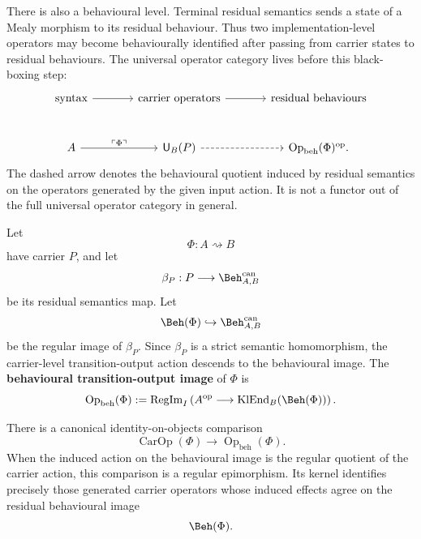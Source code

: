 There is also a behavioural level.  Terminal residual semantics sends a state of a Mealy morphism
to its residual behaviour.  Thus two implementation-level operators may become behaviourally
identified after passing from carrier states to residual behaviours.  The universal operator
category lives before this black-boxing step:
\[
\begin{tikzcd}[column sep=large,row sep=large]
\text{syntax}
\ar[r]
&
\text{carrier operators}
\ar[r]
&
\text{residual behaviours}
\\
A
\ar[r,"\ulcorner\Phi\urcorner"]
&
\mathsf U_B(P)
\ar[r,dashed]
&
\operatorname{Op}_{\mathrm{beh}}(\Phi)^{\operatorname{op}} .
\end{tikzcd}
\]
The dashed arrow denotes the behavioural quotient induced by residual semantics on the operators
generated by the given input action.  It is not a functor out of the full universal operator
category in general.

\begin{definition}
Let
\[
        \Phi:A\rightsquigarrow B
\]
have carrier \(P\), and let
\[
        \beta_P:P\longrightarrow \Beh^{\operatorname{can}}_{A,B}
\]
be its residual semantics map.  Let
\[
        \Beh(\Phi)\hookrightarrow \Beh^{\operatorname{can}}_{A,B}
\]
be the regular image of \(\beta_P\).  Since \(\beta_P\) is a strict semantic homomorphism, the
carrier-level transition-output action descends to the behavioural image.  The
\textbf{behavioural transition-output image} of \(\Phi\) is
\[
        \operatorname{Op}_{\mathrm{beh}}(\Phi)
        :=
        \operatorname{RegIm}_I
        \left(
            A^{\operatorname{op}}
            \longrightarrow
            \mathrm{KlEnd}_B(\Beh(\Phi))
        \right).
\]
\end{definition}

\begin{proposition}
\label{prop:behavioural-collapse-carrier-operators}
There is a canonical identity-on-objects comparison
\[
        \operatorname{CarOp}(\Phi)
        \longrightarrow
        \operatorname{Op}_{\mathrm{beh}}(\Phi).
\]
When the induced action on the behavioural image is the regular quotient of the carrier action,
this comparison is a regular epimorphism.  Its kernel identifies precisely those generated carrier
operators whose induced effects agree on the residual behavioural image
\[
        \Beh(\Phi).
\]
\end{proposition}

